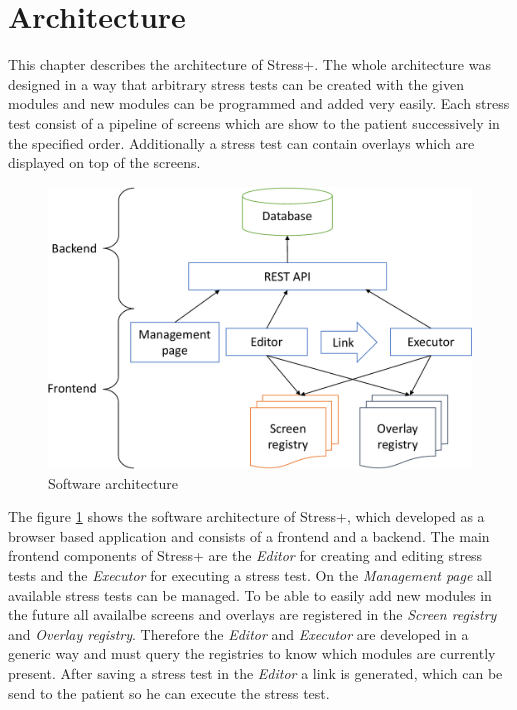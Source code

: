 \section{Architecture}
\label{sec:architecture}

This chapter describes the architecture of Stress+.
The whole architecture was designed in a way that arbitrary stress tests can be created with the given modules and new modules can be programmed and added very easily.
Each stress test consist of a pipeline of screens which are show to the patient successively in the specified order.
Additionally a stress test can contain overlays which are displayed on top of the screens.

\begin{figure}[htb]
  \centering
  \includegraphics[width=\textwidth]{figures/Architecture-crop}
  \caption{Software architecture}
  \label{fig:software-architecture}
\end{figure}

The figure \ref{fig:software-architecture} shows the software architecture of Stress+, which developed as a browser based application and consists of a frontend and a backend.
The main frontend components of Stress+ are the \textit{Editor} for creating and editing stress tests and the \textit{Executor} for executing a stress test.
On the \textit{Management page} all available stress tests can be managed.
To be able to easily add new modules in the future all availalbe screens and overlays are registered in the \textit{Screen registry} and \textit{Overlay registry}. 
Therefore the \textit{Editor} and \textit{Executor} are developed in a generic way and must query the registries to know which modules are currently present.
After saving a stress test in the \textit{Editor} a link is generated, which can be send to the patient so he can execute the stress test.

